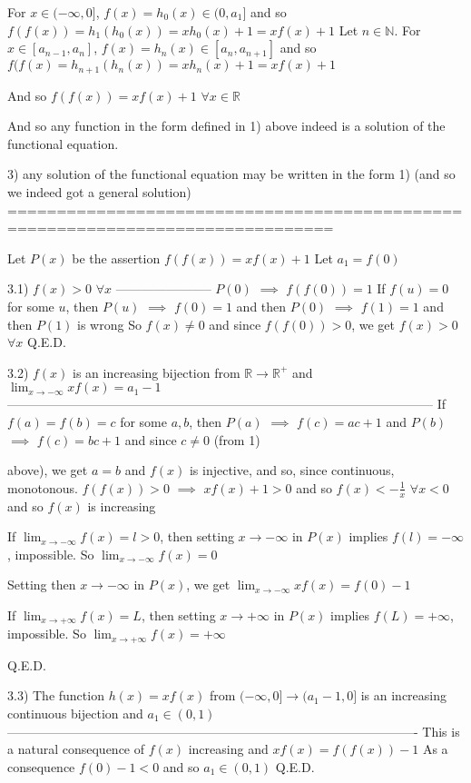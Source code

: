\begin{solution}
For $x\in(-\infty,0]$, $f(x)=h_0(x)\in(0,a_1]$ and so $f(f(x))=h_1(h_0(x))=xh_0(x)+1=xf(x)+1$
Let $n\in\mathbb N$. For $x\in[a_{n-1},a_n]$, $f(x)=h_n(x)\in[a_n,a_{n+1}]$ and so $f(f(x)=h_{n+1}(h_n(x))=xh_n(x)+1=xf(x)+1$

And so $f(f(x))=xf(x)+1$ $\forall x\in\mathbb R$

And so any function in the form defined in 1) above indeed is a solution of the functional equation.

3) any solution of the functional equation may be written in the form 1) (and so we indeed got a general solution)
===============================================================================

Let $P(x)$ be the assertion $f(f(x))=xf(x)+1$
Let $a_1=f(0)$

3.1) $f(x)>0$ $\forall x$
-----------------------
$P(0)$ $\implies$ $f(f(0))=1$
If $f(u)=0$ for some $u$, then $P(u)$ $\implies$ $f(0)=1$ and then $P(0)$ $\implies$ $f(1)=1$ and then $P(1)$ is wrong
So $f(x)\ne 0$ and since $f(f(0))>0$, we get $f(x)>0$ $\forall x$
Q.E.D.

3.2) $f(x)$ is an increasing bijection from $\mathbb R\to\mathbb R^+$ and $\lim_{x\to-\infty}xf(x)=a_1-1$
-----------------------------------------------------------------------------------------------------
If $f(a)=f(b)=c$ for some $a,b$, then $P(a)$ $\implies$ $f(c)=ac+1$ and $P(b)$ $\implies$ $f(c)=bc+1$ and since $c\ne 0$ (from 1) 

above), we get $a=b$ and $f(x)$ is injective, and so, since continuous, monotonous.
$f(f(x))>0$ $\implies$ $xf(x)+1>0$ and so $f(x)<-\frac 1x$ $\forall x<0$ and so $f(x)$ is increasing

If $\lim_{x\to-\infty}f(x)=l>0$, then setting $x\to-\infty$ in $P(x)$ implies $f(l)=-\infty$, impossible. So  $\lim_{x\to-\infty}f(x)
=0$

Setting then $x\to-\infty$ in $P(x)$, we get  $\lim_{x\to-\infty}xf(x)=f(0)-1$

If $\lim_{x\to+\infty}f(x)=L$, then setting $x\to+\infty$ in $P(x)$ implies $f(L)=+\infty$, impossible. So  $\lim_{x\to+\infty}f(x)=+
\infty$

Q.E.D.

3.3) The function $h(x)=xf(x)$ from $(-\infty,0]\to (a_1-1,0]$ is an increasing continuous bijection and $a_1\in(0,1)$
-------------------------------------------------------------------------------------------------
This is a natural consequence of $f(x)$ increasing and $xf(x)=f(f(x))-1$
As a consequence $f(0)-1<0$ and so $a_1\in(0,1)$
Q.E.D.


\end{solution}
